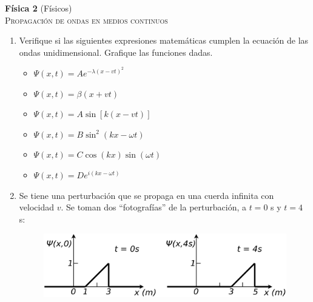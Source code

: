 \documentclass[11pt,spanish,a4paper]{article}
\begin{document}
\begin{center}
\textbf{Física 2} (Físicos) \hfill {}\\
	\textsc{\LARGE Propagación de ondas en medios continuos}
\end{center}



\begin{enumerate}

\item Verifique si las siguientes expresiones matemáticas cumplen la ecuación
de las ondas unidimensional. Grafique las funciones dadas.

\begin{itemize}
\item $\Psi(x,t)=Ae^{-\lambda(x-vt)^{2}}$
\item $\Psi(x,t)=\beta(x+vt)$
\item $\Psi(x,t)=A\sin\left[k(x-vt)\right]$
\item $\Psi(x,t)=B\sin^{2}\left(kx-\omega t\right)$
\item $\Psi(x,t)=C\cos(kx)\sin(\omega t)$
\item $\Psi(x,t)=De^{i(kx-\omega t)}$
\end{itemize}
\item Se tiene una perturbación que se propaga en una cuerda infinita con
velocidad $v$. Se toman dos ``fotografías'' de la perturbación, a
$t=0$ s y $t=4$ s:
\begin{figure}[H]
\centering{}\includegraphics[clip,scale=0.25]{ej2-2}
\end{figure}



\end{enumerate}
\end{document}

